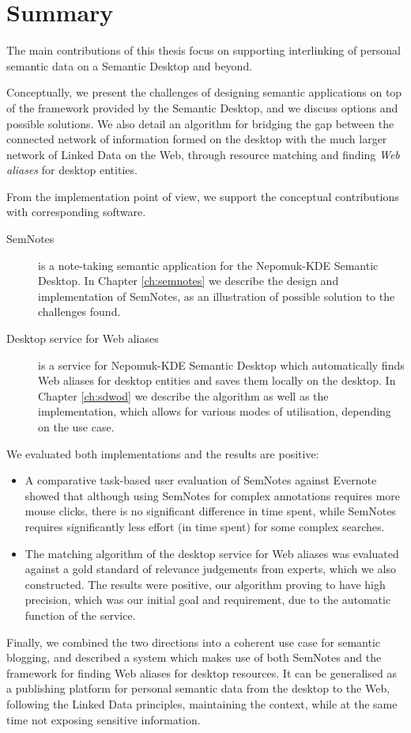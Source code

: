 \section{Summary}
\label{sec:summary}

The main contributions of this thesis focus on supporting interlinking of personal semantic data on a Semantic Desktop and beyond. 

Conceptually, we present the challenges of designing semantic applications on top of the framework provided by the Semantic Desktop, and we discuss options and possible solutions. We also detail an algorithm for bridging the gap between the connected network of information formed on the desktop with the much larger network of Linked Data on the Web, through resource matching and finding \emph{Web aliases} for desktop entities. 

From the implementation point of view, we support the conceptual contributions with corresponding software. 
\begin{description}
 \item[SemNotes] is a note-taking semantic application for the Nepomuk-KDE Semantic Desktop. In Chapter \ref{ch:semnotes} we describe the design and implementation of SemNotes, as an illustration of possible solution to the challenges found.
 \item[Desktop service for Web aliases] is a service for Nepomuk-KDE Semantic Desktop which automatically finds Web aliases for desktop entities and saves them locally on the desktop. In Chapter \ref{ch:sdwod} we describe the algorithm as well as the implementation, which allows for various modes of utilisation, depending on the use case.
\end{description}

We evaluated both implementations and the results are positive:
\begin{itemize}
 \item A comparative task-based user evaluation of SemNotes against Evernote showed that although using SemNotes for complex annotations requires more mouse clicks, there is no significant difference in time spent, while SemNotes requires significantly less effort (in time spent) for some complex searches.
 \item The matching algorithm of the desktop service for Web aliases was evaluated against a gold standard of relevance judgements from experts, which we also constructed. The results were positive, our algorithm proving to have high precision, which was our initial goal and requirement, due to the automatic function of the service.
\end{itemize}

Finally, we combined the two directions into a coherent use case for semantic blogging, and described a system which makes use of both SemNotes and the framework for finding Web aliases for desktop resources. It can be generalised as a publishing platform for personal semantic data from the desktop to the Web, following the Linked Data principles, maintaining the context, while at the same time not exposing sensitive information.
